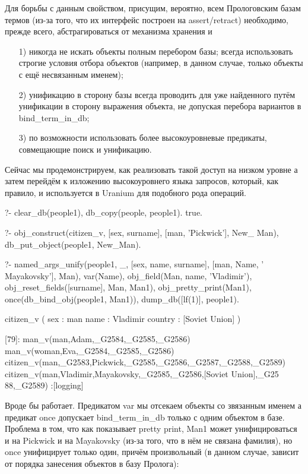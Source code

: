 \documentclass[a4paper]{book}
\def\ur{Uranium}
\begin{document}
Для борьбы с данным свойством, присущим, вероятно, всем
Прологовским базам термов (из-за того, что их интерфейс построен
на assert/retract) необходимо, прежде всего, абстрагироваться от
механизма хранения и 
\begin{itemize}
\item[1)] никогда не искать объекты полным перебором базы; всегда
  использовать строгие условия отбора объектов (например, в
  данном случае, только объекты с ещё несвязанным именем);
\item[2)] унификацию в сторону базы всегда проводить для уже
  найденного путём унификации в сторону выражения объекта, не
  допуская перебора вариантов в bind\_term\_in\_db;
\item[3)] по возможности использовать более высокоуровневые
  предикаты, совмещающие поиск и унификацию.
\end{itemize}

Сейчас мы продемонстрируем, как реализовать такой доступ на
низком уровне а затем перейдём к изложению высокоуровнего языка
запросов, который, как правило, и используется в \ur{} для
подобного рода операций.

\begin{example}{}{}
?- clear_db(people1), db_copy(people, people1).
true.

?- obj_construct(citizen_v, 
      [sex, surname], [man, 'Pickwick'], New_ Man), 
   db_put_object(people1, New_Man).
\end{example}

\begin{example}{}{}
?- named_args_unify(people1, _, 
      [sex, name, surname], [man, Name, ' Mayakovsky'], Man), 
   var(Name), 
   obj_field(Man, name, 'Vladimir'), 
   obj_reset_fields([surname], Man, Man1), 
   obj_pretty_print(Man1), 
   once(db_bind_obj(people1, Man1)), 
   dump_db([lf(1)], people1).

citizen_v ( 
  sex : man 
  name : Vladimir 
  country : [Soviet Union] 
) 

[79]: man_v(man,Adam,_G2584,_G2585,_G2586) 
man_v(woman,Eva,_G2584,_G2585,_G2586) 
citizen_v(man,_G2583,Pickwick,_G2585,_G2586,_G2587,_G2588,_G2589) 
citizen_v(man,Vladimir,Mayakovsky,_G2585,_G2586,[Soviet Union],_G25
88,_G2589)                                                        
 :[logging]
\end{example}

Вроде бы работает. Предикатом var мы отсекаем объекты со
звязанным именем а предикат once допускает bind\_term\_in\_db
только с одним объектом в базе. Проблема в том, что как
показывает pretty print, Man1 может унифицироваться и на Pickwick
и на Mayakovsky (из-за того, что в нём не связана фамилия), но
once унифицирует только один, причём произвольный (в данном
случае, зависит от порядка занесения объектов в базу Пролога):
\end{document}
